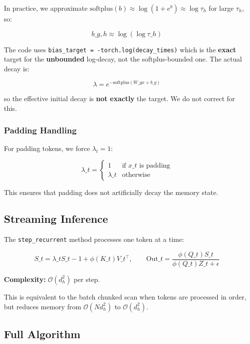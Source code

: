 In practice, we approximate $\text{softplus}(b) \approx \log(1 + e^b) \approx \log \tau_h$ for large $\tau_h$, so:

\[
b\_{g, h} \approx \log(\log \tau\_h)
\tag{4.14}
\]

The code uses \texttt{bias\_target = -torch.log(decay\_times)} which is the 
\textbf{exact} target for the \textbf{unbounded} log-decay, not the softplus-bounded one. The actual decay is:

\[
\lambda = e^{-\text{softplus}(W\_g x + b\_g)}
\]

so the effective initial decay is \textbf{not exactly} the target. We do not 
correct for this.

\subsubsection{Padding Handling}

For padding tokens, we force $\lambda_t = 1$:

\[
\lambda\_t = \begin{cases} 1 & \text{if } x\_t \text{ is padding} \\ \lambda\_t & \text{otherwise} \end{cases}
\tag{4.15}
\]

This ensures that padding does not artificially decay the memory state.

\subsection{Streaming Inference}

The \texttt{step\_recurrent} method processes one token at a time:

\[
S\_t = \lambda\_t S\_{t-1} + \phi(K\_t) V\_t^\top, \qquad
\text{Out}\_t = \frac{\phi(Q\_t) S\_t}{\phi(Q\_t) Z\_t + \epsilon}
\tag{4.16}
\]

\textbf{Complexity:} $\mathcal{O}(d_h^2)$ per step.

This is equivalent to the batch chunked scan when tokens are processed in 
order, but reduces memory from $\mathcal{O}(N d_h^2)$ to $\mathcal{O}(d_h^2)$.

\subsection{Full Algorithm}

